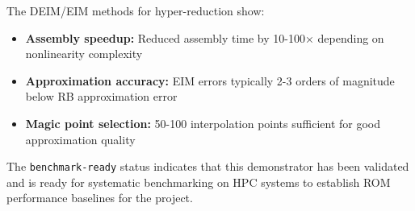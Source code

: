 The DEIM/EIM methods for hyper-reduction show:

\begin{itemize}
\item \textbf{Assembly speedup:} Reduced assembly time by 10-100× depending on nonlinearity complexity
\item \textbf{Approximation accuracy:} EIM errors typically 2-3 orders of magnitude below RB approximation error
\item \textbf{Magic point selection:} 50-100 interpolation points sufficient for good approximation quality
\end{itemize}

The \texttt{benchmark-ready} status indicates that this demonstrator has been validated and is ready for systematic benchmarking on HPC systems to establish ROM performance baselines for the \exama project.

